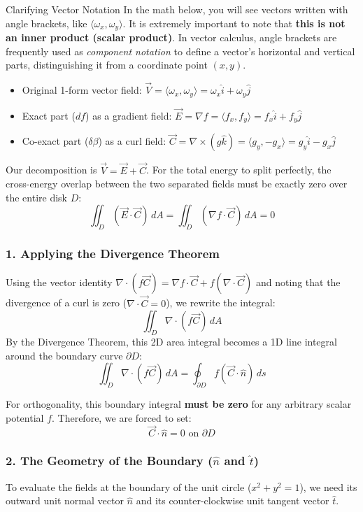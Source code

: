 \documentclass[11pt]{article}
\begin{document}
\begin{defbox}{Clarifying Vector Notation}
In the math below, you will see vectors written with angle brackets, like $\langle \omega_x, \omega_y \rangle$. It is extremely important to note that \textbf{this is not an inner product (scalar product)}. In vector calculus, angle brackets are frequently used as \textit{component notation} to define a vector's horizontal and vertical parts, distinguishing it from a coordinate point $(x,y)$.
\end{defbox}

\begin{itemize}[noitemsep]
    \item Original 1-form vector field: $\vec{V} = \langle \omega_x, \omega_y \rangle = \omega_x \hat{i} + \omega_y \hat{j}$
    \item Exact part ($df$) as a gradient field: $\vec{E} = \nabla f = \langle f_x, f_y \rangle = f_x \hat{i} + f_y \hat{j}$
    \item Co-exact part ($\delta\beta$) as a curl field: $\vec{C} = \nabla \times (g \hat{k}) = \langle g_y, -g_x \rangle = g_y \hat{i} - g_x \hat{j}$
\end{itemize}

Our decomposition is $\vec{V} = \vec{E} + \vec{C}$. For the total energy to split perfectly, the cross-energy overlap between the two separated fields must be exactly zero over the entire disk $D$:
\[ \iint_D (\vec{E} \cdot \vec{C}) \, dA = \iint_D (\nabla f \cdot \vec{C}) \, dA = 0 \]

\subsubsection*{1. Applying the Divergence Theorem}
Using the vector identity $\nabla \cdot (f\vec{C}) = \nabla f \cdot \vec{C} + f(\nabla \cdot \vec{C})$ and noting that the divergence of a curl is zero ($\nabla \cdot \vec{C} = 0$), we rewrite the integral:
\[ \iint_D \nabla \cdot (f\vec{C}) \, dA \]
By the Divergence Theorem, this 2D area integral becomes a 1D line integral around the boundary curve $\partial D$:
\[ \iint_D \nabla \cdot (f\vec{C}) \, dA = \oint_{\partial D} f (\vec{C} \cdot \hat{n}) \, ds \]

For orthogonality, this boundary integral \textbf{must be zero} for any arbitrary scalar potential $f$. Therefore, we are forced to set:
\[ \vec{C} \cdot \hat{n} = 0 \text{ on } \partial D \]

\subsubsection*{2. The Geometry of the Boundary ($\hat{n}$ and $\hat{t}$)}
To evaluate the fields at the boundary of the unit circle ($x^2 + y^2 = 1$), we need its outward unit normal vector $\hat{n}$ and its counter-clockwise unit tangent vector $\hat{t}$.
\end{document}
